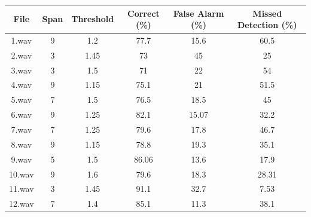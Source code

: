 \documentclass[a4paper]{article}
\begin{document}
\begin{table}[]
	\begin{tabular}{|c|c|c|c|c|c|}
		\hline
		\textbf{File} & \textbf{Span} & \textbf{Threshold} & \textbf{Correct (\%)} & \textbf{False Alarm (\%)} & \textbf{Missed Detection (\%)} \\ \hline
		1.wav         & 9             & 1.2                & 77.7                  & 15.6                      & 60.5                           \\
	\hline	2.wav         & 3             & 1.45               & 73                    & 45                        & 25                             \\
		\hline	3.wav         & 3             & 1.5                & 71                    & 22                        & 54                             \\
		\hline	4.wav         & 9             & 1.15               & 75.1              & 21                  & 51.5                       \\
		\hline	5.wav         & 7             & 1.5                & 76.5                  & 18.5                      & 45                             \\
	\hline		6.wav         & 9             & 1.25               & 82.1              & 15.07                  & 32.2                       \\
		\hline	7.wav         & 7             & 1.25               & 79.6              & 17.8                  & 46.7                       \\
		\hline	8.wav         & 9             & 1.15               & 78.8              & 19.3                  & 35.1                      \\
		\hline	9.wav         & 5             & 1.5                & 86.06              & 13.6                  & 17.9                       \\
	\hline		10.wav        & 9             & 1.6                & 79.6              & 18.3                  & 28.31                       \\
		\hline	11.wav        & 3             & 1.45               & 91.1                  & 32.7                      & 7.53                           \\
		\hline	12.wav        & 7             & 1.4                & 85.1              & 11.3                   & 38.1      \\ \hline               	
	 
	\end{tabular}

\end{table}
\end{document}
